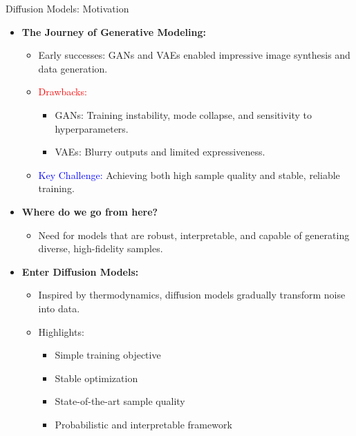 \begin{frame}[allowframebreaks]{Diffusion Models: Motivation}
    \begin{itemize}
        \item \textbf{The Journey of Generative Modeling:}
        \begin{itemize}
            \item Early successes: GANs and VAEs enabled impressive image synthesis and data generation.
            \item \textcolor{red}{Drawbacks:} 
            \begin{itemize}
                \item GANs: Training instability, mode collapse, and sensitivity to hyperparameters.
                \item VAEs: Blurry outputs and limited expressiveness.
            \end{itemize}
            \item \textcolor{blue}{Key Challenge:} Achieving both high sample quality and stable, reliable training.
        \end{itemize}
        \item \textbf{Where do we go from here?}
        \begin{itemize}
            \item Need for models that are robust, interpretable, and capable of generating diverse, high-fidelity samples.
        \end{itemize}

\framebreak

        \item \textbf{Enter Diffusion Models:}
        \begin{itemize}
            \item Inspired by thermodynamics, diffusion models gradually transform noise into data.
            \item \textcolor[rgb]{0,0.6,0}{Highlights:} 
            \begin{itemize}
                \item Simple training objective
                \item Stable optimization
                \item State-of-the-art sample quality
                \item Probabilistic and interpretable framework
            \end{itemize}
        \end{itemize}
    \end{itemize}
\end{frame}

